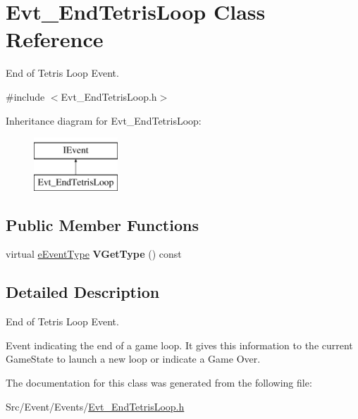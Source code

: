 \hypertarget{classEvt__EndTetrisLoop}{\section{Evt\-\_\-\-End\-Tetris\-Loop Class Reference}
\label{classEvt__EndTetrisLoop}
}


End of Tetris Loop Event.  




{\ttfamily \#include $<$Evt\-\_\-\-End\-Tetris\-Loop.\-h$>$}

Inheritance diagram for Evt\-\_\-\-End\-Tetris\-Loop\-:\begin{figure}[H]
\begin{center}
\leavevmode
\includegraphics[height=2.000000cm]{classEvt__EndTetrisLoop}
\end{center}
\end{figure}
\subsection*{Public Member Functions}
\begin{DoxyCompactItemize}
\item 
\hypertarget{classEvt__EndTetrisLoop_a43b575595d9b958c4ba17af22b734235}{virtual \hyperlink{IEvent_8h_a052e637824ed8cb8a5e9d5d73b5b3c8b}{e\-Event\-Type} {\bfseries V\-Get\-Type} () const }\label{classEvt__EndTetrisLoop_a43b575595d9b958c4ba17af22b734235}

\end{DoxyCompactItemize}


\subsection{Detailed Description}
End of Tetris Loop Event. 

Event indicating the end of a game loop. It gives this information to the current Game\-State to launch a new loop or indicate a Game Over. 

The documentation for this class was generated from the following file\-:\begin{DoxyCompactItemize}
\item 
Src/\-Event/\-Events/\hyperlink{Evt__EndTetrisLoop_8h}{Evt\-\_\-\-End\-Tetris\-Loop.\-h}\end{DoxyCompactItemize}
